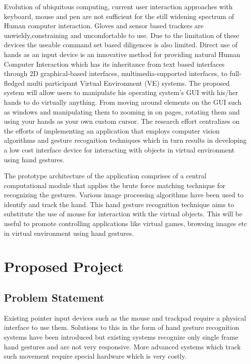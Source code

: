 \documentclass[11pt]{report}
\begin{document}
Evolution of ubiquitous computing, current user interaction approaches with keyboard, mouse and pen are not sufficient for the still widening spectrum of Human computer interaction. Gloves and sensor based trackers are unwieldy,constraining and uncomfortable to use. Due to the limitation of these devices the useable command set based diligences is also limited. Direct use of hands as an input device is an innovative method for providing natural Human Computer Interaction which has its inheritance from text based interfaces through 2D graphical-based interfaces, multimedia-supported interfaces, to full-fledged multi participant Virtual Environment (VE) systems. The proposed system will allow users to manipulate his operating system’s GUI with his/her hands to do virtually anything. From moving around elements on the GUI such as windows and manipulating them to zooming in on pages, rotating them and using your hands as your own custom cursor. The research effort centralizes on the efforts of implementing an application that employs computer vision algorithms and gesture recognition techniques which in turn results in developing a low cost interface device for interacting with objects in virtual environment using hand gestures.

The prototype architecture of the application comprises of a central computational module that applies the brute force matching technique for recognizing the gestures. Various image processing algorithms have been used to identify and track the hand. This hand gesture recognition technique aims to substitute the use of mouse for interaction with the virtual objects. This will be useful to promote controlling applications like virtual games, browsing images etc in virtual environment using hand gestures.

\section{Proposed Project}

\subsection{Problem Statement}

Existing pointer input devices such as the mouse and trackpad require a physical interface to use them. Solutions to this in the form of hand gesture recognition systems have been introduced but existing systems recognize only single frame hand gestures and are not very responsive. More advanced systems which track such movement require special hardware which is very costly.
\end{document}

